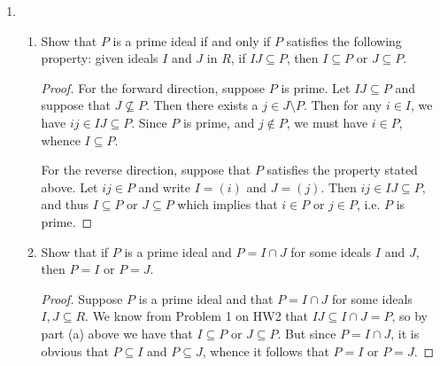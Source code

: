\documentclass[11pt,oneside,english]{amsart}
\theoremstyle{definition}
\newcommand{\MB}[1]{\mathbb{#1}}
\begin{document}
\begin{enumerate}[leftmargin=*]
\begin{enumerate}
\item Show that if $P$ is a prime ideal, then $\sqrt{P^n} = P$ for all $n \geq1$.
\begin{proof}
The proof is nearly identical to the one above: $f\in \sqrt{P^n}$ if and only if there exists an $m\in \MB{N}_0$ such that $f^m\in P^n$, if and only if $f^m=\sum_k(f_1f_2\cdots f_n)_k$ where $f_i\in P$ for all $1\leq i\leq n$, if and only if $f^m\in P$ by the definition of an ideal, if and only if $f\in P$ by the definition of a prime ideal.
\end{proof}
\end{enumerate}


\item \begin{enumerate}
\item Show that $P$ is a prime ideal if and only if $P$ satisfies the following property: given ideals $I$ and $J$ in $R$, if $IJ \subseteq P$, then $I \subseteq P$ or $J \subseteq P$.
\begin{proof}
For the forward direction, suppose $P$ is prime. Let $IJ\subseteq P$ and suppose that $J\not\subseteq P$. Then there exists a $j\in J\setminus P$. Then for any $i\in I$, we have $ij\in IJ\subseteq P$. Since $P$ is prime, and $j\notin P$, we must have $i\in P$, whence $I\subseteq P$.

For the reverse direction, suppose that $P$ satisfies the property stated above. Let $ij\in P$ and write $I=(i)$ and $J=(j)$. Then $ij\in IJ\subseteq P$, and thus $I\subseteq P$ or $J\subseteq P$ which implies that $i\in P$ or $j\in P$, i.e. $P$ is prime.
\end{proof}


\item Show that if $P$ is a prime ideal and $P = I \cap J$ for some ideals $I$ and $J$, then $P = I$ or $P = J$.
\begin{proof}
Suppose $P$ is a prime ideal and that $P=I\cap J$ for some ideals $I,J\subseteq R$. We know from Problem 1 on HW2 that $IJ\subseteq I\cap J=P$, so by part (a) above we have that $I\subseteq P$ or $J\subseteq P$. But since $P=I \cap J$, it is obvious that $P\subseteq I$ and $P\subseteq J$, whence it follows that $P=I$ or $P=J$.
\end{proof}


\end{enumerate}
\end{enumerate}
\end{document}
